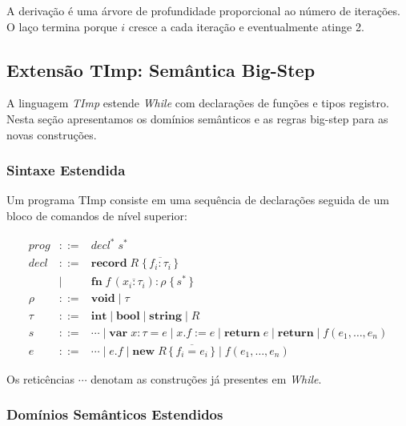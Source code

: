 A derivação é uma árvore de profundidade proporcional ao número de
iterações. O laço termina porque \(i\) cresce a cada iteração e
eventualmente atinge 2.

\subsection{Extensão TImp: Semântica Big-Step}\label{sec:timp-big-step}

A linguagem \emph{TImp} estende \emph{While} com declarações de
funções e tipos registro. Nesta seção apresentamos os domínios
semânticos e as regras big-step para as novas construções.

\subsubsection{Sintaxe Estendida}

Um programa TImp consiste em uma sequência de declarações seguida de
um bloco de comandos de nível superior:

\[
  \begin{array}{lcl}
    \mathit{prog}  & ::= & \mathit{decl}^*\; s^* \\[4pt]
    \mathit{decl}  & ::= &
    \mathbf{record}\; R\; \{\, \overline{f_i \mathbin{:} \tau_i}\,\}  \\
    & \mid &
    \mathbf{fn}\; f\,(\overline{x_i \mathbin{:} \tau_i}) \mathbin{:}
    \rho\; \{\, s^*\,\} \\[4pt]
    \rho           & ::= & \mathbf{void} \mid \tau \\[4pt]
    \tau           & ::= & \mathbf{int} \mid \mathbf{bool} \mid
    \mathbf{string} \mid R \\[4pt]
    s              & ::= & \cdots \mid
    \mathbf{var}\; x \mathbin{:} \tau \mathbin{=} e \mid
    x.f \mathbin{:=} e \mid
    \mathbf{return}\; e \mid \mathbf{return} \mid
    f(e_1,\ldots,e_n) \\[4pt]
    e              & ::= & \cdots \mid e.f \mid
    \mathbf{new}\; R\,\{\,\overline{f_i \mathbin{=} e_i}\,\} \mid
    f(e_1,\ldots,e_n)
  \end{array}
\]

Os reticências \(\cdots\) denotam as construções já presentes em
\emph{While}.

\subsubsection{Domínios Semânticos Estendidos}

